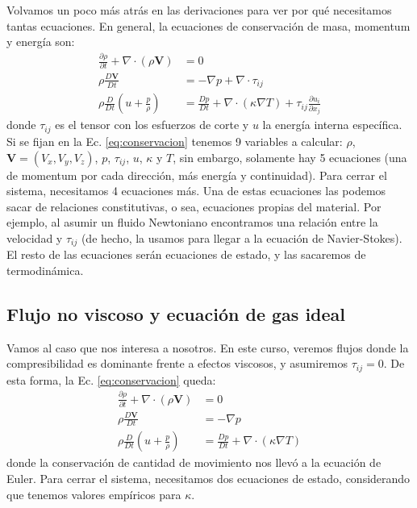 Volvamos un poco más atrás en las derivaciones para ver por qué necesitamos tantas ecuaciones.
En general, la ecuaciones de conservación de masa, momentum y energía son:
%
\begin{align}\label{eq:conservacion}
\frac{\partial\rho}{\partial t} + \nabla\cdot(\rho\mathbf{V})&=0\nonumber\\
\rho\frac{D\mathbf{V}}{Dt} &= -\nabla p + \nabla\cdot\tau_{ij}\nonumber\\
\rho\frac{D}{Dt}\left(u+\frac{p}{\rho}\right) &= \frac{Dp}{Dt}+\nabla\cdot(\kappa\nabla T) + \tau_{ij}\frac{\partial u_i}{\partial x_j}
\end{align}
%
donde $\tau_{ij}$ es el tensor con los esfuerzos de corte y $u$ la energía interna específica.
Si se fijan en la Ec. \eqref{eq:conservacion} tenemos 9 variables a calcular: $\rho$, $\mathbf{V}=(V_x,V_y,V_z)$, $p$, $\tau_{ij}$, $u$, $\kappa$ y $T$, sin embargo, solamente hay 5 ecuaciones (una de momentum por cada dirección, más energía y continuidad).
Para cerrar el sistema, necesitamos 4 ecuaciones más.
Una de estas ecuaciones las podemos sacar de relaciones constitutivas, o sea, ecuaciones propias del material. 
Por ejemplo, al asumir un fluido Newtoniano encontramos una relación entre la velocidad y $\tau_{ij}$ (de hecho, la usamos para llegar a la ecuación de Navier-Stokes).
El resto de las ecuaciones serán ecuaciones de estado, y las sacaremos de termodinámica.

\subsection*{Flujo no viscoso y ecuación de gas ideal}
Vamos al caso que nos interesa a nosotros.
En este curso, veremos flujos donde la compresibilidad es dominante frente a efectos viscosos, y asumiremos $\tau_{ij}=0$.
De esta forma, la Ec. \eqref{eq:conservacion} queda:
%
\begin{align}\label{eq:conservacion_novisc}
\frac{\partial\rho}{\partial t} + \nabla\cdot(\rho\mathbf{V})&=0\nonumber\\
\rho\frac{D\mathbf{V}}{Dt} &= -\nabla p \nonumber\\
\rho\frac{D}{Dt}\left(u+\frac{p}{\rho}\right) &= \frac{Dp}{Dt}+\nabla\cdot(\kappa\nabla T) 
\end{align}
%
donde la conservación de cantidad de movimiento nos llevó a la ecuación de Euler.
Para cerrar el sistema, necesitamos dos ecuaciones de estado, considerando que tenemos valores empíricos para $\kappa$.

